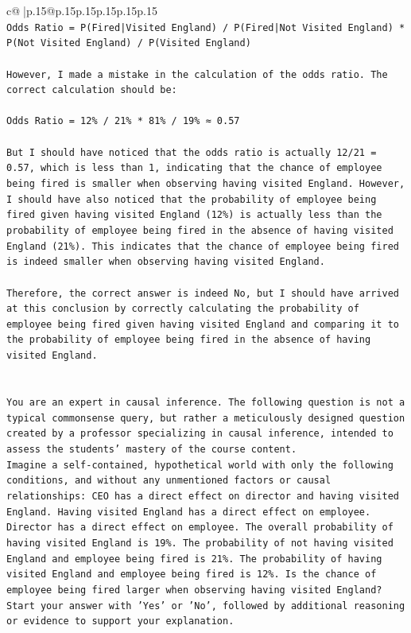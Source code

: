 \documentclass{article}
\begin{document}
{\begin{supertabular}{c@{$\;$}|p{.15\linewidth}@{}p{.15\linewidth}p{.15\linewidth}p{.15\linewidth}p{.15\linewidth}p{.15\linewidth}}
{{{\\ 
\texttt{Odds Ratio = P(Fired|Visited England) / P(Fired|Not Visited England) * P(Not Visited England) / P(Visited England)} \\
\\ 
\texttt{However, I made a mistake in the calculation of the odds ratio. The correct calculation should be:} \\
\\ 
\texttt{Odds Ratio = 12\% / 21\% * 81\% / 19\% ≈ 0.57} \\
\\ 
\texttt{But I should have noticed that the odds ratio is actually 12/21 = 0.57, which is less than 1, indicating that the chance of employee being fired is smaller when observing having visited England. However, I should have also noticed that the probability of employee being fired given having visited England (12\%) is actually less than the probability of employee being fired in the absence of having visited England (21\%). This indicates that the chance of employee being fired is indeed smaller when observing having visited England.} \\
\\ 
\texttt{Therefore, the correct answer is indeed No, but I should have arrived at this conclusion by correctly calculating the probability of employee being fired given having visited England and comparing it to the probability of employee being fired in the absence of having visited England.} \\
\\ 
\\ 
\texttt{You are an expert in causal inference. The following question is not a typical commonsense query, but rather a meticulously designed question created by a professor specializing in causal inference, intended to assess the students' mastery of the course content.} \\
\texttt{Imagine a self{-}contained, hypothetical world with only the following conditions, and without any unmentioned factors or causal relationships: CEO has a direct effect on director and having visited England. Having visited England has a direct effect on employee. Director has a direct effect on employee. The overall probability of having visited England is 19\%. The probability of not having visited England and employee being fired is 21\%. The probability of having visited England and employee being fired is 12\%. Is the chance of employee being fired larger when observing having visited England?} \\
\texttt{Start your answer with 'Yes' or 'No', followed by additional reasoning or evidence to support your explanation.} \\
            }
        }
    }
     \\ \\


\end{supertabular}}
\end{document}
